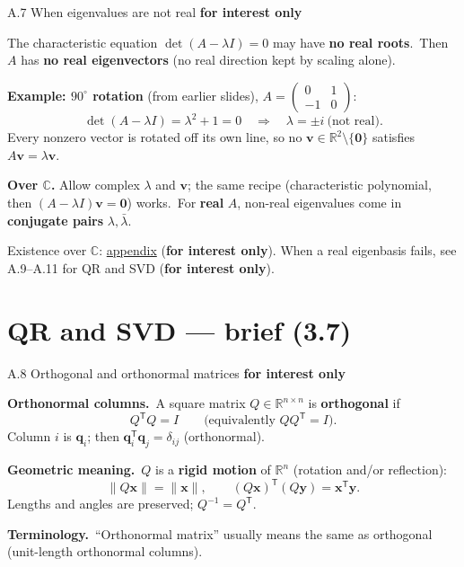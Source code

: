 \documentclass[11pt,aspectratio=169]{beamer}
\newcommand{\InterestOnly}{\textcolor{mAccent}{\textbf{for interest only}}}
\newcommand{\AppendixLink}[1]{%
  \hyperlink{#1}{\textcolor{mAccent}{appendix}}}
\begin{document}
\begin{frame}{A.7 When eigenvalues are not real}
  \hypertarget{sec:complex-eigenvalues}{}
  \footnotesize
  \InterestOnly

  \medskip
  The characteristic equation $\det(A-\lambda I)=0$ may have \textbf{no real roots}.\
  Then $A$ has \textbf{no real eigenvectors} (no real direction kept by scaling alone).

  \medskip
  \textbf{Example: $90^\circ$ rotation} (from earlier slides),
  $A=\begin{pmatrix}0&1\\ -1&0\end{pmatrix}$:
  \[
    \det(A-\lambda I)=\lambda^2+1=0
    \quad\Rightarrow\quad
    \lambda=\pm i\ \text{(not real)}.
  \]
  Every nonzero vector is rotated off its own line, so no $\mathbf{v}\in\mathbb{R}^2\setminus\{\mathbf{0}\}$ satisfies $A\mathbf{v}=\lambda\mathbf{v}$.

  \medskip
  \textbf{Over $\mathbb{C}$.} Allow complex $\lambda$ and $\mathbf{v}$; the same recipe (characteristic polynomial, then $(A-\lambda I)\mathbf{v}=\mathbf{0}$) works.\
  For \textbf{real} $A$, non-real eigenvalues come in \textbf{conjugate pairs} $\lambda,\bar\lambda$.

  \medskip
  {\scriptsize Existence over $\mathbb{C}$: \AppendixLink{sec:eigenvalue-exists} (\InterestOnly). When a real eigenbasis fails, see A.9--A.11 for QR and SVD (\InterestOnly).}
\end{frame}

\section{QR and SVD --- brief (3.7)}

\begin{frame}{A.8 Orthogonal and orthonormal matrices}
  \hypertarget{sec:orthonormal-matrices}{}
  \footnotesize
  \InterestOnly

  \medskip
  \textbf{Orthonormal columns.}\
  A square matrix $Q\in\mathbb{R}^{n\times n}$ is \textbf{orthogonal} if
  \[
    Q^{\mathsf T}Q=I
    \qquad\text{(equivalently $QQ^{\mathsf T}=I$).}
  \]
  Column $i$ is $\mathbf{q}_i$; then $\mathbf{q}_i^{\mathsf T}\mathbf{q}_j=\delta_{ij}$ (orthonormal).

  \medskip
  \textbf{Geometric meaning.}\
  $Q$ is a \textbf{rigid motion} of $\mathbb{R}^n$ (rotation and/or reflection):
  \[
    \|Q\mathbf{x}\|=\|\mathbf{x}\|,
    \qquad
    (Q\mathbf{x})^{\mathsf T}(Q\mathbf{y})=\mathbf{x}^{\mathsf T}\mathbf{y}.
  \]
  Lengths and angles are preserved; $Q^{-1}=Q^{\mathsf T}$.

  \medskip
  \textbf{Terminology.}\
  ``Orthonormal matrix'' usually means the same as orthogonal (unit-length orthonormal columns).
\end{frame}
\end{document}

